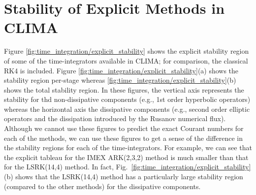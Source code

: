 \documentclass{report}
\begin{document}
\section{Stability of Explicit Methods in CLIMA}
Figure \ref{fig:time_integration/explicit_stability} shows the explicit stability region of some of the time-integrators available in CLIMA; for comparison, the classical RK4 is included.  Figure \ref{fig:time_integration/explicit_stability}(a) shows the stability region per-stage whereas \ref{fig:time_integration/explicit_stability}(b) shows the total stability region.  In these figures, the vertical axis represents the stability for thd non-dissipative components (e.g., 1st order hyperbolic operators) whereas the horizontal axis the dissipative components (e.g., second order elliptic operators and the dissipation introduced by the Rusanov numerical flux).  Although we cannot use these figures to predict the exact Courant numbers for each of the methods, we can use these figures to get a sense of the difference in the stability regions for each of the time-integrators. For example, we can see that the explicit tableau for the IMEX ARK(2,3,2) method is much smaller than that for the LSRK(14,4) method. In fact, Fig.\ \ref{fig:time_integration/explicit_stability}(b) shows that the LSRK(14,4) method has a particularly large stability region (compared to the other methods) for the dissipative components.
\end{document}
